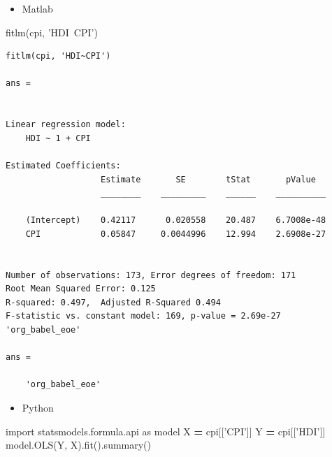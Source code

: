 \documentclass[]{book}
\newenvironment{Shaded}{\begin{snugshade}}{\end{snugshade}}
\newcommand{\StringTok}[1]{\textcolor[rgb]{0.31,0.60,0.02}{#1}}
\newcommand{\ImportTok}[1]{#1}
\newcommand{\OperatorTok}[1]{\textcolor[rgb]{0.81,0.36,0.00}{\textbf{#1}}}
\newcommand{\NormalTok}[1]{#1}
\providecommand{\tightlist}{%
  \setlength{\itemsep}{0pt}\setlength{\parskip}{0pt}}
\begin{document}
\begin{itemize}
\tightlist
\item
  Matlab
\end{itemize}

\begin{Shaded}
\begin{Highlighting}[]
\NormalTok{fitlm(cpi, }\StringTok{'HDI~CPI'}\NormalTok{)}
\end{Highlighting}
\end{Shaded}

\begin{verbatim}
fitlm(cpi, 'HDI~CPI')

ans = 


Linear regression model:
    HDI ~ 1 + CPI

Estimated Coefficients:
                   Estimate       SE        tStat       pValue  
                   ________    _________    ______    __________

    (Intercept)    0.42117      0.020558    20.487    6.7008e-48
    CPI            0.05847     0.0044996    12.994    2.6908e-27


Number of observations: 173, Error degrees of freedom: 171
Root Mean Squared Error: 0.125
R-squared: 0.497,  Adjusted R-Squared 0.494
F-statistic vs. constant model: 169, p-value = 2.69e-27
'org_babel_eoe'

ans =

    'org_babel_eoe'
\end{verbatim}

\begin{itemize}
\tightlist
\item
  Python
\end{itemize}

\begin{Shaded}
\begin{Highlighting}[]
\ImportTok{import}\NormalTok{ statsmodels.formula.api }\ImportTok{as}\NormalTok{ model}
\NormalTok{X }\OperatorTok{=}\NormalTok{ cpi[[}\StringTok{'CPI'}\NormalTok{]]}
\NormalTok{Y }\OperatorTok{=}\NormalTok{ cpi[[}\StringTok{'HDI'}\NormalTok{]]}
\NormalTok{model.OLS(Y, X).fit().summary()}
\end{Highlighting}
\end{Shaded}
\end{document}
